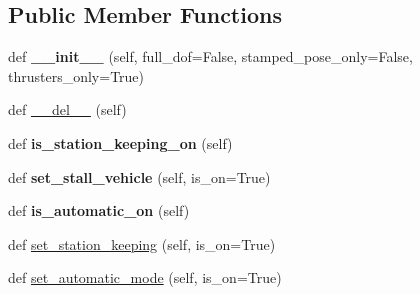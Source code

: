 \subsection*{Public Member Functions}
\begin{DoxyCompactItemize}
\item 
\mbox{\label{classuuv__control__interfaces_1_1dp__controller__local__planner_1_1DPControllerLocalPlanner_a9f9cf285950251ce33098d5ed2a2c75a}} 
def {\bfseries \+\_\+\+\_\+init\+\_\+\+\_\+} (self, full\+\_\+dof=False, stamped\+\_\+pose\+\_\+only=False, thrusters\+\_\+only=True)
\item 
def \hyperlink{classuuv__control__interfaces_1_1dp__controller__local__planner_1_1DPControllerLocalPlanner_a1e359e0c4268f8587f0a2cab1d545a74}{\+\_\+\+\_\+del\+\_\+\+\_\+} (self)
\item 
\mbox{\label{classuuv__control__interfaces_1_1dp__controller__local__planner_1_1DPControllerLocalPlanner_a19a70bed9ae0001434ff4cfce4963ab3}} 
def {\bfseries is\+\_\+station\+\_\+keeping\+\_\+on} (self)
\item 
\mbox{\label{classuuv__control__interfaces_1_1dp__controller__local__planner_1_1DPControllerLocalPlanner_a00dcadecc3c28660de8e41ac0f06f4db}} 
def {\bfseries set\+\_\+stall\+\_\+vehicle} (self, is\+\_\+on=True)
\item 
\mbox{\label{classuuv__control__interfaces_1_1dp__controller__local__planner_1_1DPControllerLocalPlanner_ac0cb56e9cb16f4249a222bc2d93c5a57}} 
def {\bfseries is\+\_\+automatic\+\_\+on} (self)
\item 
def \hyperlink{classuuv__control__interfaces_1_1dp__controller__local__planner_1_1DPControllerLocalPlanner_a8e6d4a2721e5d6eda14386c8cfe3e6c4}{set\+\_\+station\+\_\+keeping} (self, is\+\_\+on=True)
\item 
def \hyperlink{classuuv__control__interfaces_1_1dp__controller__local__planner_1_1DPControllerLocalPlanner_acbe4ccf881650464969425b43d76a633}{set\+\_\+automatic\+\_\+mode} (self, is\+\_\+on=True)

\end{DoxyCompactItemize}
